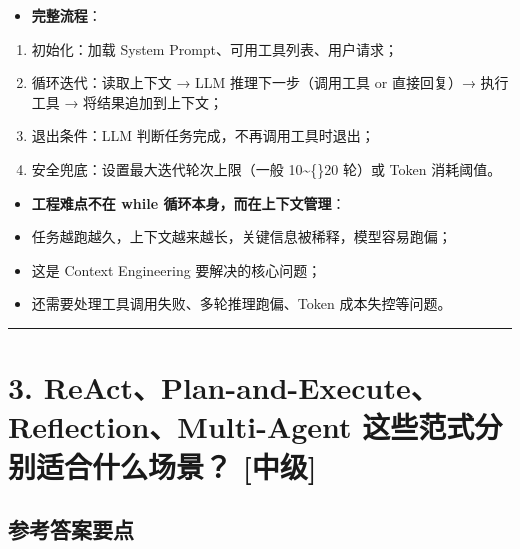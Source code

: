 \documentclass[9pt,a4paper,twocolumn]{ctexart}
\newcommand{\lvzhong}{\usebox{\badgezhongbox}}
\def\lvzhong{[中级]}%
\begin{document}
\begin{itemize}[itemsep=1pt, topsep=2pt]
  \item \textbf{完整流程}：
\end{itemize}
\begin{enumerate}[itemsep=1pt, topsep=2pt]
  \item 初始化：加载 System Prompt、可用工具列表、用户请求；
  \item 循环迭代：读取上下文 → LLM 推理下一步（调用工具 or 直接回复）→ 执行工具 → 将结果追加到上下文；
  \item 退出条件：LLM 判断任务完成，不再调用工具时退出；
  \item 安全兜底：设置最大迭代轮次上限（一般 10\textasciitilde\{\}20 轮）或 Token 消耗阈值。
\end{enumerate}
\begin{itemize}[itemsep=1pt, topsep=2pt]
  \item \textbf{工程难点不在 while 循环本身，而在上下文管理}：
  \item 任务越跑越久，上下文越来越长，关键信息被稀释，模型容易跑偏；
  \item 这是 Context Engineering 要解决的核心问题；
  \item 还需要处理工具调用失败、多轮推理跑偏、Token 成本失控等问题。
\end{itemize}


\vspace{2pt}
\noindent\rule{\columnwidth}{0.3pt}\vspace{2pt}



\section*{3. ReAct、Plan-and-Execute、Reflection、Multi-Agent 这些范式分别适合什么场景？ \lvzhong{}}


\subsection*{参考答案要点}
\end{document}
